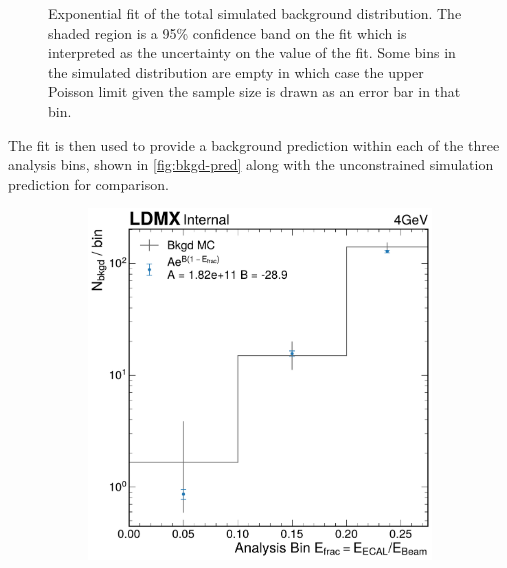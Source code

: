 \begin{figure}
\begin{subfigure}{0.48\textwidth}
  \end{subfigure}
  \caption{%
    Exponential fit of the total simulated background distribution.
    The shaded region is a 95\% confidence band on the fit which is interpreted
    as the uncertainty on the value of the fit.
    Some bins in the simulated distribution are empty in which case the upper Poisson limit
    given the sample size is drawn as an error bar in that bin.
  }
  \label{fig:bkgd-fit}
\end{figure}

The fit is then used to provide a background prediction within each of the three analysis bins,
shown in \cref{fig:bkgd-pred} along with the unconstrained simulation prediction for comparison.

\begin{figure}
  \centering
  \begin{subfigure}{0.48\textwidth}
    \includegraphics[width=\textwidth]{figures/ldmx/analysis/4gev-integrated-bkgd-fit.pdf}
  \end{subfigure}
  ~
  \begin{subfigure}{0.48\textwidth}

\end{subfigure}
\end{figure}
